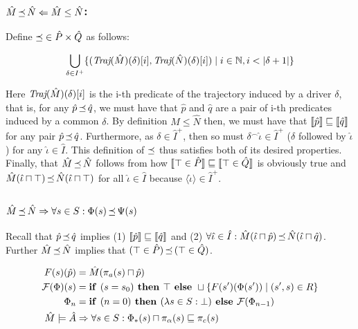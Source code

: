 \subsubsection{$\hat M \operatorname{\mathrel{\preceq}} \hat N \Leftarrow \hat M \leq \hat N$:} Define $\operatorname{\mathrel{\preceq}} \in \hat P \times \hat Q$ as follows:

\begin{equation*}
\bigcup_{\delta \in I^{+}} \{ (\textit{Traj}(\hat M)(\delta)[i], \textit{Traj}(\hat N)(\delta)[i]) \mid i \in \mathbb{N}, i < | \delta + 1 | \}
\end{equation*}

\noindent Here $\textit{Traj}(\hat M)(\delta)[i]$ is the i-th predicate of the trajectory induced by a driver $\delta$, that is, for any $\hat p \operatorname{\mathrel{\preceq}} \hat q$, we must have that $\hat p$ and $\hat q$ are a pair of i-th predicates induced by a common $\delta$. By definition $\hat M \leq \hat N$ then, we must have that $\llbracket\hat p\rrbracket \sqsubseteq \llbracket\hat q\rrbracket$ for any pair $\hat p \operatorname{\mathrel{\preceq}} \hat q$. Furthermore, as $\delta \in \hat I^{+}$, then so must $\delta^{\frown}\hat \iota \in \hat I^{+}$ ($\delta$ followed by $\hat \iota$) for any $\hat \iota \in \hat I$. This definition of $\operatorname{\mathrel{\preceq}}$ thus satisfies both of its desired properties. Finally, that $\hat M \operatorname{\mathrel{\preceq}} \hat N$ follows from how $\llbracket\top \in \hat P\rrbracket \sqsubseteq \llbracket\top \in \hat Q\rrbracket$ is obviously true and $\hat M(\hat \iota \sqcap \top) \operatorname{\mathrel{\preceq}} \hat N(\hat \iota \sqcap \top)$ for all $\hat \iota \in \hat I$ because $\langle \hat \iota \rangle \in \hat I^{+}$.

\subsection{$\hat M \operatorname{\mathrel{\preceq}} \hat N \Rightarrow \forall s \in S : \Phi(s) \operatorname{\mathrel{\preceq}} \Psi(s)$}

Recall that $\hat p \operatorname{\mathrel{\preceq}} \hat q$ implies (1) $\llbracket\hat p\rrbracket \sqsubseteq \llbracket\hat q\rrbracket$ and (2) $\forall \hat \iota \in \hat I : \hat M(\hat \iota \sqcap \hat p) \operatorname{\mathrel{\preceq}} \hat N(\hat \iota \sqcap \hat q)$. Further $\hat M \operatorname{\mathrel{\preceq}} \hat N$ implies that $(\top \in \hat P) \operatorname{\mathrel{\preceq}} \, (\top \in \hat Q)$.

\begin{align*}
F(s)(\hat p) &= \hat M(\pi_{a}(s) \sqcap \hat p) \\
\mathcal{F}(\Phi)(s) &= \textrm{\textbf{if }} (s = s_{0}) \textrm{\textbf{ then }} \top \textrm{\textbf{ else }} \sqcup \{ F(s')(\Phi(s')) \mid (s',s) \in R \} \\
\Phi_{n} &= \textrm{\textbf{if }} (n = 0) \textrm{\textbf{ then }} (\lambda s \in S : \bot) \textrm{\textbf{ else }} \mathcal{F}(\Phi_{n-1}) \\
\hat M \models \hat A &\Rightarrow \forall s \in S : \Phi_{*}(s) \sqcap \pi_{\alpha}(s) \sqsubseteq \pi_{c}(s)
\end{align*}

